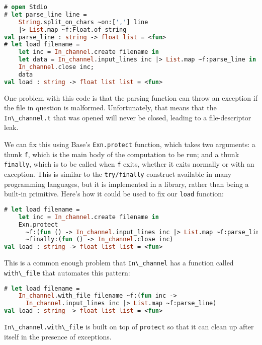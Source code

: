 \begin{lstlisting}[language=Caml]
# open Stdio
# let parse_line line =
    String.split_on_chars ~on:[','] line
    |> List.map ~f:Float.of_string
val parse_line : string -> float list = <fun>
# let load filename =
    let inc = In_channel.create filename in
    let data = In_channel.input_lines inc |> List.map ~f:parse_line in
    In_channel.close inc;
    data
val load : string -> float list list = <fun>
\end{lstlisting}

One problem with this code is that the parsing function can throw an
exception if the file in question is malformed. Unfortunately, that
means that the \passthrough{\lstinline!In\_channel.t!} that was opened
will never be closed, leading to a file-descriptor leak.

We can fix this using Base's \passthrough{\lstinline!Exn.protect!}
function, which takes two arguments: a thunk
\passthrough{\lstinline!f!}, which is the main body of the computation
to be run; and a thunk \passthrough{\lstinline!finally!}, which is to be
called when \passthrough{\lstinline!f!} exits, whether it exits normally
or with an exception. This is similar to the
\passthrough{\lstinline!try/finally!} construct available in many
programming languages, but it is implemented in a library, rather than
being a built-in primitive. Here's how it could be used to fix our
\passthrough{\lstinline!load!} function:

\begin{lstlisting}[language=Caml]
# let load filename =
    let inc = In_channel.create filename in
    Exn.protect
      ~f:(fun () -> In_channel.input_lines inc |> List.map ~f:parse_line)
      ~finally:(fun () -> In_channel.close inc)
val load : string -> float list list = <fun>
\end{lstlisting}

This is a common enough problem that
\passthrough{\lstinline!In\_channel!} has a function called
\passthrough{\lstinline!with\_file!} that automates this pattern:

\begin{lstlisting}[language=Caml]
# let load filename =
    In_channel.with_file filename ~f:(fun inc ->
      In_channel.input_lines inc |> List.map ~f:parse_line)
val load : string -> float list list = <fun>
\end{lstlisting}

\passthrough{\lstinline!In\_channel.with\_file!} is built on top of
\passthrough{\lstinline!protect!} so that it can clean up after itself
in the presence of exceptions.

